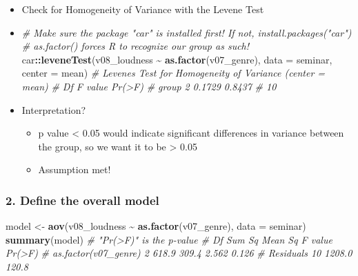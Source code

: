 \documentclass[
]{book}
\newenvironment{Shaded}{\begin{snugshade}}{\end{snugshade}}
\newcommand{\AttributeTok}[1]{\textcolor[rgb]{0.13,0.29,0.53}{#1}}
\newcommand{\CommentTok}[1]{\textcolor[rgb]{0.56,0.35,0.01}{\textit{#1}}}
\newcommand{\FunctionTok}[1]{\textcolor[rgb]{0.13,0.29,0.53}{\textbf{#1}}}
\newcommand{\NormalTok}[1]{#1}
\newcommand{\OtherTok}[1]{\textcolor[rgb]{0.56,0.35,0.01}{#1}}
\newcommand{\SpecialCharTok}[1]{\textcolor[rgb]{0.81,0.36,0.00}{\textbf{#1}}}
\providecommand{\tightlist}{%
  \setlength{\itemsep}{0pt}\setlength{\parskip}{0pt}}
\begin{document}
\begin{itemize}
\item
  Check for Homogeneity of Variance with the Levene Test
\item
\begin{Shaded}
\begin{Highlighting}[]
\CommentTok{\# Make sure the package "car" is installed first! If not, install.packages("car")}
\CommentTok{\# as.factor() forces R to recognize our group as such!}
\NormalTok{car}\SpecialCharTok{::}\FunctionTok{leveneTest}\NormalTok{(v08\_loudness }\SpecialCharTok{\textasciitilde{}} \FunctionTok{as.factor}\NormalTok{(v07\_genre), }\AttributeTok{data =}\NormalTok{ seminar, }\AttributeTok{center =}\NormalTok{ mean)}
\CommentTok{\# Levene\textquotesingle{}s Test for Homogeneity of Variance (center = mean)}
\CommentTok{\#       Df F value Pr(\textgreater{}F)}
\CommentTok{\# group  2  0.1729 0.8437}
\CommentTok{\#       10}
\end{Highlighting}
\end{Shaded}
\item
  Interpretation?

  \begin{itemize}
  \tightlist
  \item
    p value \textless{} 0.05 would indicate significant differences in variance between the group, so we want it to be \textgreater{} 0.05
  \item
    Assumption met!
  \end{itemize}
\end{itemize}

\subsubsection*{2. Define the overall model}\label{define-the-overall-model}

\begin{Shaded}
\begin{Highlighting}[]
\NormalTok{model }\OtherTok{\textless{}{-}} \FunctionTok{aov}\NormalTok{(v08\_loudness }\SpecialCharTok{\textasciitilde{}} \FunctionTok{as.factor}\NormalTok{(v07\_genre), }\AttributeTok{data =}\NormalTok{ seminar)}
\FunctionTok{summary}\NormalTok{(model) }\CommentTok{\# "Pr(\textgreater{}F)" is the p{-}value}
\CommentTok{\#                      Df Sum Sq Mean Sq F value Pr(\textgreater{}F)}
\CommentTok{\# as.factor(v07\_genre)  2  618.9   309.4   2.562  0.126}
\CommentTok{\# Residuals            10 1208.0   120.8}
\end{Highlighting}
\end{Shaded}
\end{document}

